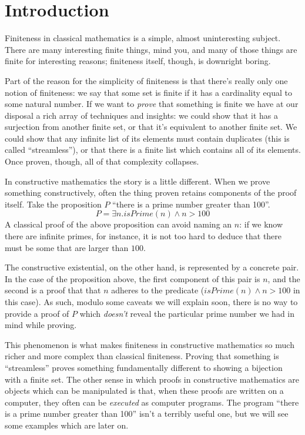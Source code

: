 \section{Introduction}
Finiteness in classical mathematics is a simple, almost uninteresting subject.
There are many interesting finite things, mind you, and many of those things are
finite for interesting reasons; finiteness itself, though, is downright boring.

Part of the reason for the simplicity of finiteness is that there's really only
one notion of finiteness: we say that some set is finite if it has a cardinality
equal to some natural number.
If we want to \emph{prove} that something is finite we have at our disposal a
rich array of techniques and insights: we could show that it has a surjection
from another finite set, or that it's equivalent to another finite set.
We could show that any infinite list of its elements must contain duplicates
(this is called ``streamless''), or that there is a finite list which contains
all of its elements.
Once proven, though, all of that complexity collapses.

In constructive mathematics the story is a little different.
When we prove something constructively, often the thing proven retains
components of the proof itself.
Take the proposition \(P\) ``there is a prime number greater than 100''.
\begin{equation}
  P = \exists n. \mathit{isPrime}(n) \wedge n > 100
\end{equation}
A classical proof of the above proposition can avoid naming an \(n\): if we know
there are infinite primes, for instance, it is not too hard to deduce that there
must be some that are larger than \(100\).

The constructive existential, on the other hand, is represented by a concrete
pair.
In the case of the proposition above, the first component of this pair is \(n\),
and the second is a proof that that \(n\) adheres to the predicate
(\(\mathit{isPrime}(n) \wedge n > 100\) in this case).
As such, modulo some caveats we will explain soon, there is no way to provide a
proof of \(P\) which \emph{doesn't} reveal the particular prime number we had in
mind while proving.

This phenomenon is what makes finiteness in constructive mathematics so much
richer and more complex than classical finiteness.
Proving that something is ``streamless'' proves something fundamentally
different to showing a bijection with a finite set.
The other sense in which proofs in constructive mathematics are objects which
can be manipulated is that, when these proofs are written on a computer, they
often can be \emph{executed} as computer programs.
The program ``there is a prime number greater than 100'' isn't a terribly useful
one, but we will see some examples which are later on.

